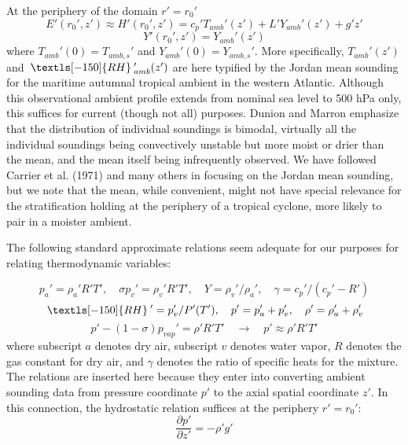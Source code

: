 \documentclass[preprint, prX]{revtex4}
\newcommand{\pd}[2]{\frac{\partial#1}{\partial#2}}
\newcommand{\rh}{\:\textls[-150]{RH}\:}
\begin{document}
At the periphery of the domain $r '= r_0'$
\begin{equation}
E'(r_0',z')\approx H'(r_0',z') = c_p'T_{amb}'(z') + L' Y_{amb}'(z') + g'z'
\end{equation}
\begin{equation}
Y'(r_0', z') = Y_{amb}'(z')
\end{equation}
where $T_{amb}'(0) = T_{amb,s}'$ and $Y_{amb}'(0) = Y_{amb,s}'$. More specifically, $T_{amb}'(z')$ and $\rh_{amb}'(z')$ are here typified by the Jordan mean sounding for the maritime autumnal tropical ambient in the western Atlantic. Although this observational ambient profile extends from nominal sea level to 500 hPa only, this suffices for current (though not all) purposes. Dunion and Marron emphasize that the distribution of individual soundings is bimodal, virtually all the individual soundings being convectively unstable but more moist or drier than the mean, and the mean itself being infrequently observed. We have followed Carrier et al. (1971) and many others in focusing on the Jordan mean sounding, but we note that the mean, while convenient, might not have special relevance for the stratification holding at the periphery of a tropical cyclone, more likely to pair in a moister ambient.

The following standard approximate relations seem adequate for our purposes for relating thermodynamic variables:

\begin{equation}
p_a' = \rho_a' R'T', \quad \sigma p_{v}'=\rho_{v}'R' T', \quad Y = \rho_{v}'/\rho_a', \quad \gamma = c_p'/(c_p'-R')
\end{equation}
\begin{equation}
\rh'=p_{v}'/P'(T'), \quad p'=p_a'+p_{v}', \quad \rho' = \rho_a' + \rho_{v}'
\end{equation}
\begin{equation}
p'-(1-\sigma)p_{vap}' = \rho' R'T' \quad \rightarrow \quad p' \approx \rho' R' T'
\end{equation}
where subscript $a$ denotes dry air, subscript $v$ denotes water vapor, $R$ denotes the gas constant for dry air, and $\gamma$ denotes the ratio of specific heats for the mixture. The relations are inserted here because they enter into converting ambient sounding data from pressure coordinate $p'$ to the axial spatial coordinate $z'$. In this connection, the hydrostatic relation suffices at the periphery $r' = r_0'$:
\begin{equation}
\pd{p'}{z'} = -\rho' g'
\end{equation}
\end{document}
